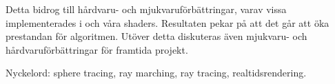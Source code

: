 	Detta bidrog till hårdvaru- och mjukvaruförbättringar, varav vissa 
	implementerades i \clash och våra shaders. Resultaten pekar på att det går 
	att öka prestandan för algoritmen. Utöver detta diskuteras även mjukvaru- 
	och hårdvaruförbättringar för framtida projekt.

	\vfill
	Nyckelord: sphere tracing, ray marching, ray tracing, realtidsrendering.


\newpage
\thispagestyle{empty}
\mbox{}
